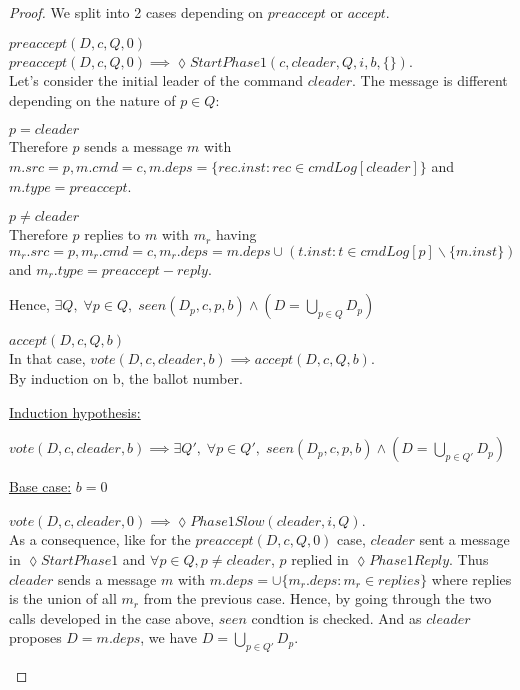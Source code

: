 \documentclass[a4paper]{article}
\theoremstyle{definition}
\theoremstyle{plain}
\begin{document}
\begin{proof}
We split into 2 cases depending on $preaccept$ or $accept$.

\begin{case}
    \item $preaccept(D,c,Q,0)$ \\
    $preaccept(D,c,Q,0) \implies \lozenge StartPhase1(c,cleader,Q,i,b,\{\})$.\\
    Let's consider the initial leader of the command $cleader$. The message is different depending on the nature of $p \in Q$:
    \begin{case}
        \item $p=cleader$\\
        Therefore $p$ sends a message $m$ with $m.src=p,m.cmd=c,m.deps= \{rec.inst : rec \in cmdLog[cleader]\}$ and $m.type = preaccept$.
        \item $p \neq cleader$\\
        Therefore $p$ replies to $m$ with $m_r$ having $m_r.src=p,m_r.cmd=c,m_r.deps= m.deps \cup ({t.inst : t \in cmdLog[p]} \backslash \{m.inst\})$ and $m_r.type = preaccept-reply$.
    \end{case}
    Hence, $\exists Q, \; \forall p \in Q, \; seen(D_p,c,p,b) \wedge (D = \bigcup_{p \in Q}{D_p})$
    
    \item $accept(D,c,Q,b)$ \\
    In that case, $vote(D,c,cleader,b) \implies accept(D,c,Q,b)$.\\
    By induction on b, the ballot number.
    
\begin{flushleft}
\underline{Induction hypothesis:}\\
\end{flushleft}
$ vote(D,c,cleader,b) \implies \exists Q', \; \forall p \in Q', \; seen(D_p,c,p,b) \wedge (D = \bigcup_{p \in Q'}{D_p})$
\begin{flushleft}
\underline{Base case:} $b = 0$
\end{flushleft}
$vote(D,c,cleader,0) \implies \lozenge Phase1Slow(cleader,i,Q)$.\\
As a consequence, like for the $preaccept(D,c,Q,0)$ case, $cleader$ sent a message in $\lozenge StartPhase1$ and $\forall p \in Q, p \neq cleader$, $p$ replied in $\lozenge Phase1Reply$. Thus $cleader$ sends a message $m$ with $m.deps = \cup \{m_r.deps : m_r \in replies\}$ where replies is the union of all $m_r$ from the previous case. Hence, by going through the two calls developed in the case above, $seen$ condtion is checked. And as $cleader$ proposes $D=m.deps$, we have $D = \bigcup_{p \in Q'}{D_p}$.



\end{case}
\end{proof}
\end{document}
